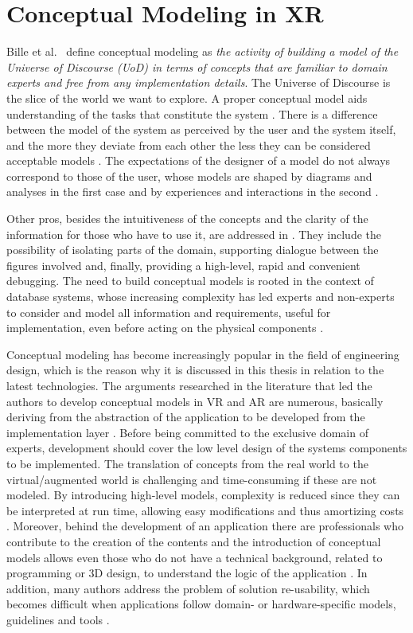 \section{Conceptual Modeling in XR}
\label{sec:background-conceptual}

Bille et al.~\cite{bille_conceptual_2007} define conceptual modeling as \textit{the activity of building a model of the Universe of Discourse (UoD) in terms of concepts that are familiar to domain experts and free from any implementation details}. The Universe of Discourse is the slice of the world we want to explore. 
A proper conceptual model aids understanding of the tasks that constitute the system \cite{norman_design_2013}. There is a difference between the model of the system as perceived by the user and the system itself, and the more they deviate from each other the less they can be considered acceptable models \cite{rosson_usability_2002}. The expectations of the designer of a model do not always correspond to those of the user, whose models are shaped by diagrams and analyses in the first case and by experiences and interactions in the second \cite{laviola_jr_3d_2017}. 

Other pros, besides the intuitiveness of the concepts and the clarity of the information for those who have to use it, are addressed in \cite{bille_conceptual_2007}. They include the possibility of isolating parts of the domain, supporting dialogue between the figures involved and, finally, providing a high-level, rapid and convenient debugging. 
The need to build conceptual models is rooted in the context of database systems, whose increasing complexity has led experts and non-experts to consider and model all information and requirements, useful for implementation, even before acting on the physical components \cite{connolly_database_2005}.

Conceptual modeling has become increasingly popular in the field of engineering design, which is the reason why it is discussed in this thesis in relation to the latest technologies. 
The arguments researched in the literature that led the authors to develop conceptual models in VR and AR are numerous, basically deriving from the abstraction of the application to be developed from the implementation layer \cite{de_troyer_conceptual_2007}. Before being committed to the exclusive domain of experts, development should cover the low level design of the systems components to be implemented. The translation of concepts from the real world to the virtual/augmented world is challenging and time-consuming if these are not modeled. By introducing high-level models, complexity is reduced since they can be interpreted at run time, allowing easy modifications and thus amortizing costs \cite{coninx_vr-demo_2006}. 
Moreover, behind the development of an application there are professionals who contribute to the creation of the contents and the introduction of conceptual models allows even those who do not have a technical background, related to programming or 3D design, to understand the logic of the application \cite{walczak_structured_2008}. 
In addition, many authors address the problem of solution re-usability, which becomes difficult when applications follow domain- or hardware-specific models, guidelines and tools \cite{figueroa_conceptual_2006}. 

